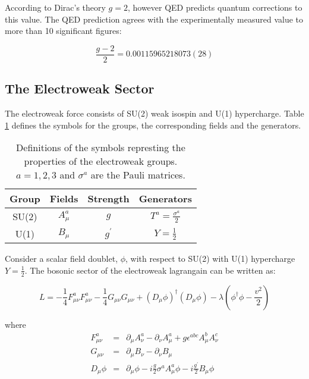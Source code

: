 According to Dirac's theory $g = 2$, however QED predicts quantum corrections to
this value. The QED prediction agrees with the experimentally measured value 
\cite{qed} to more than 10 significant figures:

\begin{equation}
\frac{g - 2}{2} = 0.00115965218073(28)
\end{equation}


\subsection{The Electroweak Sector}

The electroweak force consists of SU(2) weak isospin and U(1) hypercharge. Table 
\ref{tab:ewk} defines the symbols for the groups, the corresponding fields and 
the generators. \\

\begin{table}
\begin{center}
\begin{tabular}{|c|c|c|c|}
\hline
Group & Fields & Strength & Generators \\
\hline
SU(2) & $A_{\mu}^{a}$ & $g$ & $T^{a} = \frac{\sigma^{a}}{2}$ \\
U(1) & $B_{\mu}$ & $g^{\prime}$ & $Y = \frac{1}{2}$ \\
\hline
\end{tabular}
\end{center}
\caption{Definitions of the symbols represting the properties of the electroweak
groups. $a = 1, 2, 3$ and $\sigma^{a}$ are the Pauli matrices.}
\label{tab:ewk}
\end{table}

Consider a scalar field doublet, $\phi$, with respect to SU(2) with U(1) 
hypercharge $Y = \frac{1}{2}$. The bosonic sector of the electroweak lagrangain 
can be written as:

\begin{equation}
L = -\frac{1}{4}F_{\mu\nu}^{a}F_{\mu\nu}^{a}
-\frac{1}{4}G_{\mu\nu}G_{\mu\nu} + (D_{\mu}\phi)^{\dagger}(D_{\mu}\phi) -
\lambda\left(\phi^{\dagger}\phi - \frac{v^{2}}{2}\right)
\label{eq:ew}
\end{equation}

where
\begin{eqnarray}
F_{\mu\nu}^{a} &=& \partial_{\mu}A_{\nu}^{a} - \partial_{\nu}A_{\mu}^{a} +
g\epsilon^{abc}A_{\mu}^{b}A_{\nu}^{c} \\
G_{\mu\nu} &=& \partial_{\mu}B_{\nu} - \partial_{\nu}B_{\mu} \\
D_{\mu}\phi &=& \partial_{\mu}\phi - i\frac{g}{2}\sigma^{a}A_{\mu}^{a}\phi -
i\frac{g^{\prime}}{2}B_{\mu}\phi
\end{eqnarray}


